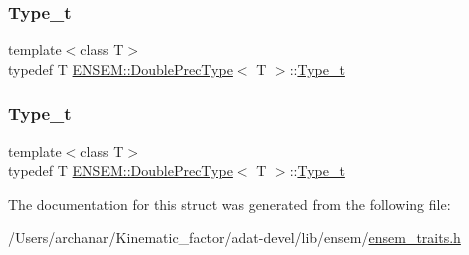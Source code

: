 \subsubsection{\texorpdfstring{Type\_t}{Type\_t}\hspace{0.1cm}{\footnotesize\ttfamily [2/3]}}
{\footnotesize\ttfamily template$<$class T$>$ \\
typedef T \mbox{\hyperlink{structENSEM_1_1DoublePrecType}{E\+N\+S\+E\+M\+::\+Double\+Prec\+Type}}$<$ T $>$\+::\mbox{\hyperlink{structENSEM_1_1DoublePrecType_a3ad79cdc343a0aa27abdd8168287bb65}{Type\+\_\+t}}}

\mbox{\label{structENSEM_1_1DoublePrecType_a3ad79cdc343a0aa27abdd8168287bb65}} 
\subsubsection{\texorpdfstring{Type\_t}{Type\_t}\hspace{0.1cm}{\footnotesize\ttfamily [3/3]}}
{\footnotesize\ttfamily template$<$class T$>$ \\
typedef T \mbox{\hyperlink{structENSEM_1_1DoublePrecType}{E\+N\+S\+E\+M\+::\+Double\+Prec\+Type}}$<$ T $>$\+::\mbox{\hyperlink{structENSEM_1_1DoublePrecType_a3ad79cdc343a0aa27abdd8168287bb65}{Type\+\_\+t}}}



The documentation for this struct was generated from the following file\+:\begin{DoxyCompactItemize}
\item 
/\+Users/archanar/\+Kinematic\+\_\+factor/adat-\/devel/lib/ensem/\mbox{\hyperlink{adat-devel_2lib_2ensem_2ensem__traits_8h}{ensem\+\_\+traits.\+h}}\end{DoxyCompactItemize}
